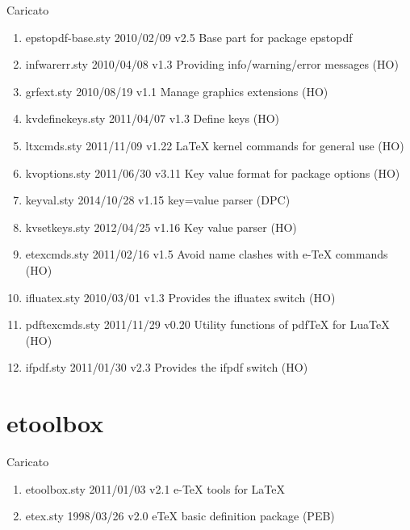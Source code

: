 Caricato 
\begin{enumerate}
\item epstopdf-base.sty 2010/02/09 v2.5 Base part for package epstopdf
\item infwarerr.sty 2010/04/08 v1.3 Providing info/warning/error messages (HO)
\item grfext.sty 2010/08/19 v1.1 Manage graphics extensions (HO)
\item kvdefinekeys.sty 2011/04/07 v1.3 Define keys (HO)
\item ltxcmds.sty 2011/11/09 v1.22 LaTeX kernel commands for general use (HO)
\item kvoptions.sty 2011/06/30 v3.11 Key value format for package options (HO)
\item keyval.sty 2014/10/28 v1.15 key=value parser (DPC)
\item kvsetkeys.sty 2012/04/25 v1.16 Key value parser (HO)
\item etexcmds.sty 2011/02/16 v1.5 Avoid name clashes with e-TeX commands (HO)
\item ifluatex.sty 2010/03/01 v1.3 Provides the ifluatex switch (HO)
\item pdftexcmds.sty 2011/11/29 v0.20 Utility functions of pdfTeX for LuaTeX (HO)
\item ifpdf.sty 2011/01/30 v2.3 Provides the ifpdf switch (HO)
\end{enumerate} 
\section{etoolbox}

Caricato 
\begin{enumerate}
\item etoolbox.sty 2011/01/03 v2.1 e-TeX tools for LaTeX
\item etex.sty 1998/03/26 v2.0 eTeX basic definition package (PEB)
\end{enumerate}
